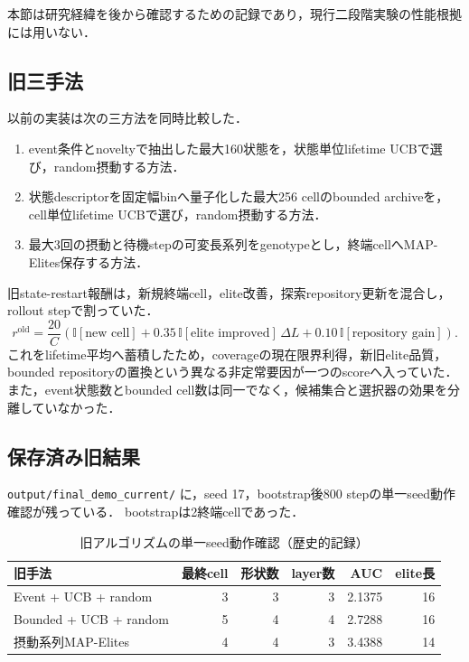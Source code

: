 \documentclass[a4paper,11pt]{ltjsarticle}
\newcommand{\code}[1]{\nolinkurl{#1}}
\newcommand{\ind}{\mathbb{I}}
\begin{document}
本節は研究経緯を後から確認するための記録であり，現行二段階実験の性能根拠には用いない．

\subsection{旧三手法}

以前の実装は次の三方法を同時比較した．
\begin{enumerate}
  \item event条件とnoveltyで抽出した最大160状態を，状態単位lifetime UCBで選び，random摂動する方法．
  \item 状態descriptorを固定幅binへ量子化した最大256 cellのbounded archiveを，cell単位lifetime UCBで選び，random摂動する方法．
  \item 最大3回の摂動と待機stepの可変長系列をgenotypeとし，終端cellへMAP-Elites保存する方法．
\end{enumerate}

旧state-restart報酬は，新規終端cell，elite改善，探索repository更新を混合し，rollout stepで割っていた．
\begin{equation}
  r^{\mathrm{old}}
  =\frac{20}{C}
  \left(
  \ind[\text{new cell}]
  +0.35\,\ind[\text{elite improved}]\,\Delta L
  +0.10\,\ind[\text{repository gain}]
  \right).
\end{equation}
これをlifetime平均へ蓄積したため，coverageの現在限界利得，新旧elite品質，
bounded repositoryの置換という異なる非定常要因が一つのscoreへ入っていた．
また，event状態数とbounded cell数は同一でなく，候補集合と選択器の効果を分離していなかった．

\subsection{保存済み旧結果}

\code{output/final_demo_current/} に，seed 17，bootstrap後800 stepの単一seed動作確認が残っている．
bootstrapは2終端cellであった．

\begin{table}[H]
\centering
\caption{旧アルゴリズムの単一seed動作確認（歴史的記録）}
\label{tab:legacy-result}
\small
\begin{tabularx}{\linewidth}{Xrrrrr}
\toprule
旧手法 & 最終cell & 形状数 & layer数 & AUC & elite長\\
\midrule
Event + UCB + random & 3 & 3 & 3 & 2.1375 & 16\\
Bounded + UCB + random & 5 & 4 & 4 & 2.7288 & 16\\
摂動系列MAP-Elites & 4 & 4 & 3 & 3.4388 & 14\\
\bottomrule
\end{tabularx}
\end{table}
\end{document}
